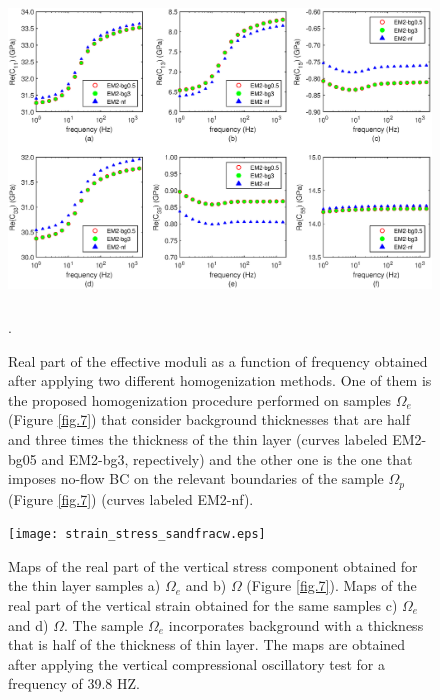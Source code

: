 \documentclass[draft]{agujournal2019}
\begin{document}
\begin{figure}[!ht]
\centering
        \includegraphics[width= 120mm, height=80mm]{cij_2sandfracw.eps}
\caption{Real part of the effective moduli as a function of frequency obtained after applying two different homogenization methods. One of them is the proposed homogenization procedure performed on samples $\Omega_e$ (Figure \ref{fig.7}) that consider background thicknesses that are half and three times the thickness of the thin layer (curves labeled EM2-bg05 and EM2-bg3, repectively) and the other one is the one that imposes no-flow BC on the relevant boundaries of the sample $\Omega_p$ (Figure \ref{fig.7}) (curves labeled EM2-nf). }. 

\label{fig.8}
\end{figure}

\begin{figure}[!ht]
\centering
        \texttt{[image: strain\_stress\_sandfracw.eps]}
\caption{Maps of the real part of the vertical stress component obtained for the thin layer samples a) $\Omega_e$  and b) $\Omega$ (Figure \ref{fig.7}). Maps of the real part of the vertical strain  obtained for the same samples c) $\Omega_e$  and d) $\Omega$. 
The sample $\Omega_e$ incorporates background with a thickness that is half of the thickness of thin layer.
The maps are obtained after applying the vertical compressional oscillatory test for a frequency of 39.8 HZ.}
\label{fig.9}
\end{figure}
\end{document}
